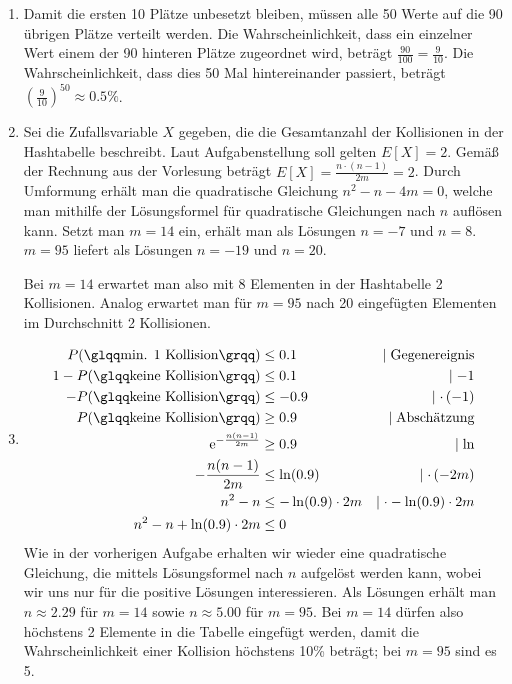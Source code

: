 \documentclass[11pt,a4paper]{article}
\begin{document}
\begin{loesung}
    \begin{enumerate}
        \item Damit die ersten 10 Plätze unbesetzt bleiben, müssen alle 50 Werte auf die 90 übrigen Plätze verteilt werden.
        Die Wahrscheinlichkeit, dass ein einzelner Wert einem der 90 hinteren Plätze zugeordnet wird, beträgt $\frac{90}{100} = \frac{9}{10}$.
        Die Wahrscheinlichkeit, dass dies 50 Mal hintereinander passiert, beträgt $\left(\frac{9}{10}\right)^{50} \approx 0.5\%$.

        \item Sei die Zufallsvariable $X$ gegeben, die die Gesamtanzahl der Kollisionen in der Hashtabelle beschreibt. 
        Laut Aufgabenstellung soll gelten $E[X] = 2$.
        Gemäß der Rechnung aus der Vorlesung beträgt $E[X] = \frac{n \cdot (n - 1)}{2m} = 2$.
        Durch Umformung erhält man die quadratische Gleichung $n^2 - n - 4m = 0$, welche man mithilfe der Lösungsformel für quadratische Gleichungen nach $n$ auflösen kann.
        Setzt man $m = 14$ ein, erhält man als Lösungen $n = -7$ und $n = 8$.
        $m = 95$ liefert als Lösungen $n = -19$ und $n = 20$.

        Bei $m = 14$ erwartet man also mit 8 Elementen in der Hashtabelle 2 Kollisionen.
        Analog erwartet man für $m = 95$ nach 20 eingefügten Elementen im Durchschnitt 2 Kollisionen.
        
        \item
        \begin{align*}
            P(\text{\quotes{min. 1 Kollision}}) &\leq 0.1 & \mid \text{Gegenereignis}\\
            1 - P(\text{\quotes{keine Kollision}}) &\leq 0.1 & \mid -1\\
            - P(\text{\quotes{keine Kollision}}) &\leq -0.9 & \mid \cdot\,(-1)\\
            P(\text{\quotes{keine Kollision}}) &\geq 0.9 & \mid \text{Abschätzung}\\
            \mathrm{e}^{-\frac{n (n - 1)}{2m}} &\geq 0.9 & \mid \ln\\
            -\frac{n (n - 1)}{2m} &\leq \ln(0.9) & \mid \cdot \,(-2m) \\
            n^2 - n &\leq -\ln(0.9) \cdot 2m & \mid \cdot - \ln(0.9) \cdot 2m\\
            n^2 - n + \ln(0.9) \cdot 2m &\leq 0 
        \end{align*}
        Wie in der vorherigen Aufgabe erhalten wir wieder eine quadratische Gleichung, die mittels Lösungsformel nach $n$ aufgelöst werden kann, wobei wir uns nur für die positive Lösungen interessieren.
        Als Lösungen erhält man $n \approx 2.29$ für $m = 14$ sowie $n \approx 5.00$ für $m = 95$.
        Bei $m = 14$ dürfen also höchstens 2 Elemente in die Tabelle eingefügt werden, damit die Wahrscheinlichkeit einer Kollision höchstens 10\% beträgt; bei $m = 95$ sind es 5.


\end{enumerate}
\end{loesung}
\end{document}
